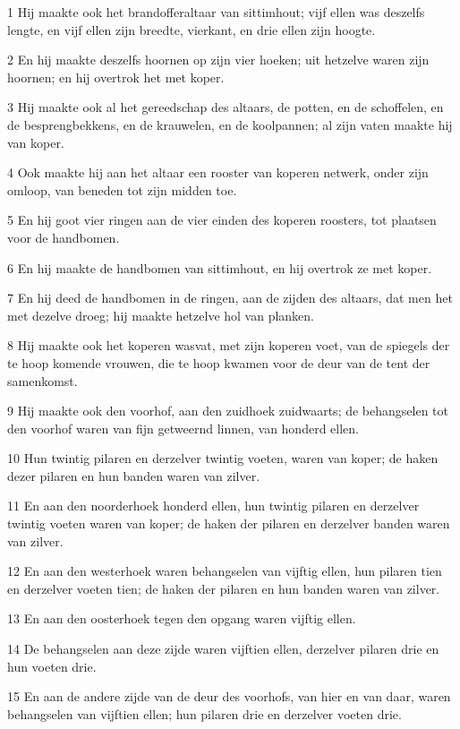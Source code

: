 \par 1 Hij maakte ook het brandofferaltaar van sittimhout; vijf ellen was deszelfs lengte, en vijf ellen zijn breedte, vierkant, en drie ellen zijn hoogte.
\par 2 En hij maakte deszelfs hoornen op zijn vier hoeken; uit hetzelve waren zijn hoornen; en hij overtrok het met koper.
\par 3 Hij maakte ook al het gereedschap des altaars, de potten, en de schoffelen, en de besprengbekkens, en de krauwelen, en de koolpannen; al zijn vaten maakte hij van koper.
\par 4 Ook maakte hij aan het altaar een rooster van koperen netwerk, onder zijn omloop, van beneden tot zijn midden toe.
\par 5 En hij goot vier ringen aan de vier einden des koperen roosters, tot plaatsen voor de handbomen.
\par 6 En hij maakte de handbomen van sittimhout, en hij overtrok ze met koper.
\par 7 En hij deed de handbomen in de ringen, aan de zijden des altaars, dat men het met dezelve droeg; hij maakte hetzelve hol van planken.
\par 8 Hij maakte ook het koperen wasvat, met zijn koperen voet, van de spiegels der te hoop komende vrouwen, die te hoop kwamen voor de deur van de tent der samenkomst.
\par 9 Hij maakte ook den voorhof, aan den zuidhoek zuidwaarts; de behangselen tot den voorhof waren van fijn getweernd linnen, van honderd ellen.
\par 10 Hun twintig pilaren en derzelver twintig voeten, waren van koper; de haken dezer pilaren en hun banden waren van zilver.
\par 11 En aan den noorderhoek honderd ellen, hun twintig pilaren en derzelver twintig voeten waren van koper; de haken der pilaren en derzelver banden waren van zilver.
\par 12 En aan den westerhoek waren behangselen van vijftig ellen, hun pilaren tien en derzelver voeten tien; de haken der pilaren en hun banden waren van zilver.
\par 13 En aan den oosterhoek tegen den opgang waren vijftig ellen.
\par 14 De behangselen aan deze zijde waren vijftien ellen, derzelver pilaren drie en hun voeten drie.
\par 15 En aan de andere zijde van de deur des voorhofs, van hier en van daar, waren behangselen van vijftien ellen; hun pilaren drie en derzelver voeten drie.
